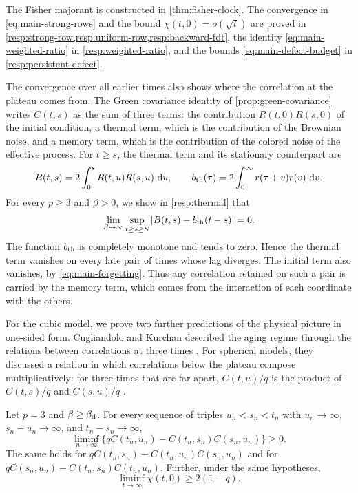 The Fisher majorant is constructed in \cref{thm:fisher-clock}. The convergence in \eqref{eq:main-strong-rows} and the bound $\chi(t,0)=o(\sqrt t)$ are proved in \cref{resp:strong-row,resp:uniform-row,resp:backward-fdt}, the identity \eqref{eq:main-weighted-ratio} in \cref{resp:weighted-ratio}, and the bounds \eqref{eq:main-defect-budget} in \cref{resp:persistent-defect}.

The convergence over all earlier times also shows where the correlation at the plateau comes from. The Green covariance identity of \cref{prop:green-covariance} writes $C(t,s)$ as the sum of three terms: the contribution $R(t,0)R(s,0)$ of the initial condition, a thermal term, which is the contribution of the Brownian noise, and a memory term, which is the contribution of the colored noise of the effective process. For $t\ge s$, the thermal term and its stationary counterpart are
\[
 B(t,s)=2\int_0^sR(t,u)R(s,u)\,\mathop{}\!\mathrm d u,
 \qquad b_{\rm th}(\tau)=2\int_0^\infty r(\tau+v)r(v)\,\mathop{}\!\mathrm d v.
\]
For every $p\ge3$ and $\beta>0$, we show in \cref{resp:thermal} that
\begin{equation}
 \lim_{S\to\infty}\sup_{t\ge s\ge S}|B(t,s)-b_{\rm th}(t-s)|=0.
 \label{eq:main-thermal}
\end{equation}
The function $b_{\rm th}$ is completely monotone and tends to zero. Hence the thermal term vanishes on every late pair of times whose lag diverges. The initial term also vanishes, by \eqref{eq:main-forgetting}. Thus any correlation retained on such a pair is carried by the memory term, which comes from the interaction of each coordinate with the others.

For the cubic model, we prove two further predictions of the physical picture in one-sided form. Cugliandolo and Kurchan described the aging regime through the relations between correlations at three times \cite[arXiv version~1, Section~5]{ck1994}. For spherical models, they discussed a relation in which correlations below the plateau compose multiplicatively: for three times that are far apart, $C(t,u)/q$ is the product of $C(t,s)/q$ and $C(s,u)/q$ \cite[arXiv version~1, Section~5.1, Equation~(5.1.8)]{ck1994}.

\begin{theorem}\label{thm:main-geometry}
Let $p=3$ and $\beta\ge\beta_{\mathrm d}$. For every sequence of triples $u_n<s_n<t_n$ with $u_n\to\infty$, $s_n-u_n\to\infty$, and $t_n-s_n\to\infty$,
\begin{equation}
 \liminf_{n\to\infty}
 \bigl\{qC(t_n,u_n)-C(t_n,s_n)C(s_n,u_n)\bigr\}\ge0.
 \label{eq:main-product}
\end{equation}
The same holds for $qC(t_n,s_n)-C(t_n,u_n)C(s_n,u_n)$ and for $qC(s_n,u_n)-C(t_n,s_n)C(t_n,u_n)$. Further, under the same hypotheses,
\begin{equation}
 \liminf_{t\to\infty}\chi(t,0)\ge2(1-q).
 \label{eq:main-susceptibility}
\end{equation}
\end{theorem}

